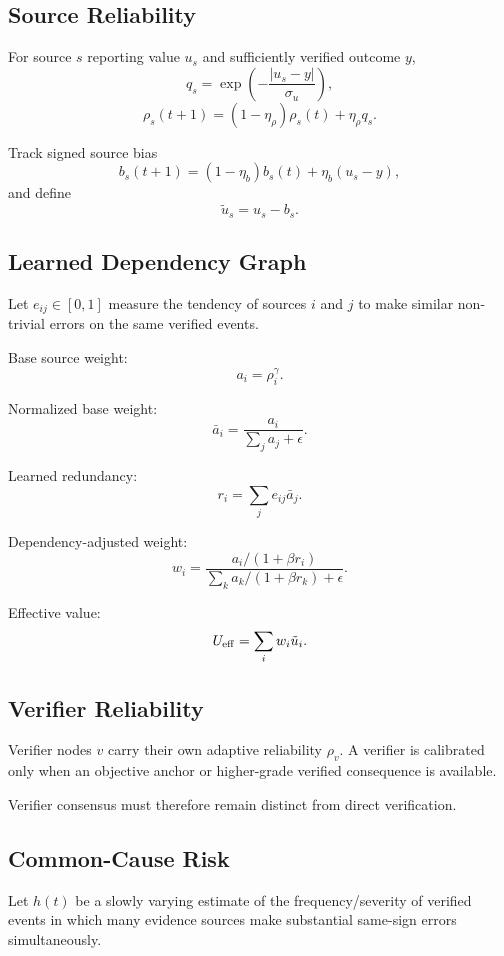

\subsection{Source Reliability}

For source $s$ reporting value $u_s$ and sufficiently verified outcome $y$,
\[
q_s
=
\exp\left(
-\frac{|u_s-y|}{\sigma_u}
\right),
\]
\[
\rho_s(t+1)
=
(1-\eta_\rho)\rho_s(t)
+
\eta_\rho q_s.
\]

Track signed source bias
\[
b_s(t+1)
=
(1-\eta_b)b_s(t)
+
\eta_b(u_s-y),
\]
and define
\[
\tilde u_s=u_s-b_s.
\]

\subsection{Learned Dependency Graph}

Let $e_{ij}\in[0,1]$ measure the tendency of sources $i$ and $j$
to make similar non-trivial errors on the same verified events.

Base source weight:
\[
a_i=\rho_i^\gamma.
\]

Normalized base weight:
\[
\bar a_i
=
\frac{a_i}{\sum_j a_j+\epsilon}.
\]

Learned redundancy:
\[
r_i
=
\sum_j e_{ij}\bar a_j.
\]

Dependency-adjusted weight:
\[
w_i
=
\frac{
a_i/(1+\beta r_i)
}{
\sum_k a_k/(1+\beta r_k)+\epsilon
}.
\]

Effective value:
\[
U_{\rm eff}
=
\sum_i w_i\tilde u_i.
\]

\subsection{Verifier Reliability}

Verifier nodes $v$ carry their own adaptive reliability $\rho_v$.
A verifier is calibrated only when an objective anchor or higher-grade
verified consequence is available.

Verifier consensus must therefore remain distinct from direct verification.

\subsection{Common-Cause Risk}

Let $h(t)$ be a slowly varying estimate of the frequency/severity of
verified events in which many evidence sources make substantial same-sign
errors simultaneously.

